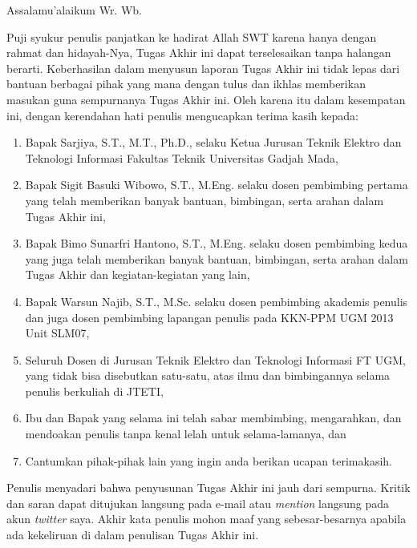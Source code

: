\documentclass{jtetiskripsi}
\begin{document}
\cover


\preface
Assalamu'alaikum Wr. Wb.

\vspace{0.5cm}

Puji syukur penulis panjatkan ke hadirat Allah SWT karena hanya dengan rahmat dan hidayah-Nya, Tugas Akhir ini dapat terselesaikan tanpa halangan berarti. Keberhasilan dalam menyusun laporan Tugas Akhir ini tidak lepas dari bantuan berbagai pihak yang mana dengan tulus dan ikhlas memberikan masukan guna sempurnanya Tugas Akhir ini. Oleh karena itu dalam kesempatan ini, dengan kerendahan hati penulis mengucapkan terima kasih kepada:

\begin{enumerate}
\item{Bapak Sarjiya, S.T., M.T., Ph.D., selaku Ketua Jurusan Teknik Elektro dan Teknologi Informasi Fakultas Teknik Universitas Gadjah Mada,}
\item{Bapak Sigit Basuki Wibowo, S.T., M.Eng. selaku dosen pembimbing pertama yang telah memberikan banyak bantuan, bimbingan, serta arahan dalam Tugas Akhir ini,}
\item{Bapak Bimo Sunarfri Hantono, S.T., M.Eng. selaku dosen pembimbing kedua yang juga telah memberikan banyak bantuan, bimbingan, serta arahan dalam Tugas Akhir dan kegiatan-kegiatan yang lain,}
\item{Bapak Warsun Najib, S.T., M.Sc. selaku dosen pembimbing akademis penulis dan juga dosen pembimbing lapangan penulis pada KKN-PPM UGM 2013 Unit SLM07,}
\item{Seluruh Dosen di Jurusan Teknik Elektro dan Teknologi Informasi FT UGM, yang tidak bisa disebutkan satu-satu, atas ilmu dan bimbingannya selama penulis berkuliah di JTETI,}
\item{Ibu dan Bapak yang selama ini telah sabar membimbing, mengarahkan, dan mendoakan penulis tanpa kenal lelah untuk selama-lamanya, dan}
\item{Cantumkan pihak-pihak lain yang ingin anda berikan ucapan terimakasih.}
\end{enumerate}


\newpage
Penulis menyadari bahwa penyusunan Tugas Akhir ini jauh dari sempurna. Kritik dan saran dapat ditujukan langsung pada e-mail atau \emph{mention} langsung pada akun \emph{twitter} saya. Akhir kata penulis mohon maaf yang sebesar-besarnya apabila ada kekeliruan di dalam penulisan Tugas Akhir ini.
\end{document}
